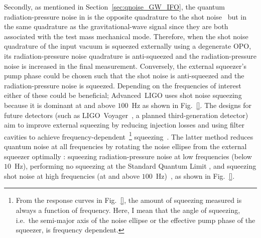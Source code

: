 Secondly, as mentioned in Section~\ref{sec:qnoise_GW_IFO}, the quantum radiation-pressure noise in is the opposite quadrature to the shot noise~\cite{}  but in the same quadrature as the gravitational-wave signal since they are both associated with the test mass mechanical mode. Therefore, when the shot noise quadrature of the input vacuum is squeezed externally using a degenerate OPO, its radiation-pressure noise quadrature is anti-squeezed and the radiation-pressure noise is increased in the final measurement. Conversely, the external squeezer's pump phase could be chosen such that the shot noise is anti-squeezed and the radiation-pressure noise is squeezed. Depending on the frequencies of interest either of these could be beneficial; Advanced~LIGO uses shot noise squeezing because it is dominant at and above $100$~Hz as shown in Fig.~\ref{}. The designs for future detectors (such as LIGO~Voyager~\cite{}, a planned third-generation detector) aim to improve external squeezing by reducing injection losses and using filter cavities to achieve frequency-dependent~\footnote{From the response curves in Fig.~\ref{}, the amount of squeezing measured is always a function of frequency. Here, I mean that the angle of squeezing, i.e.\ the semi-major axis of the noise ellipse or the effective pump phase of the squeezer, is frequency dependent.} squeezing~\cite{}. The latter method reduces quantum noise at all frequencies by rotating the noise ellipse from the external squeezer optimally : squeezing radiation-pressure noise at low frequencies (below $10$~Hz), performing no squeezing at the Standard Quantum Limit , and squeezing shot noise at high frequencies (at and above $100$~Hz)~\cite{}, as shown in Fig.~\ref{}. 
